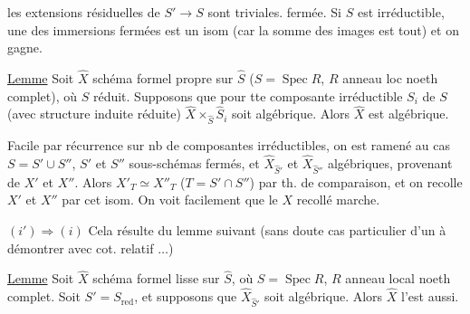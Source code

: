 les extensions résiduelles de $S'\longrightarrow S$ sont triviales.    fermée. Si $S$ est irréductible, une des immersions fermées  est un isom (car la somme des images est tout) et on gagne.  


\uline{Lemme} Soit $\widehat X$ schéma formel propre sur $\widehat S$ ($S=\operatorname{Spec}R$, $R$ anneau loc noeth complet), où $S$ réduit. Supposons que pour tte composante irréductible $S_i$ de $S$ (avec structure induite réduite) $\widehat X\times_{\widehat S}\widehat S_i$ soit algébrique. Alors $\widehat X$ est algébrique.

Facile par récurrence sur nb de composantes irréductibles, on est ramené au cas $S=S'\cup S''$, $S'$ et $S''$ sous-schémas fermés, et $\widehat X_{\widehat S'}$ et $\widehat X_{\widehat S''}$  algébriques, provenant de $X'$ et $X''$. Alors $X'_T\simeq X''_T$ ($T=S'\cap S''$) par th. de comparaison, et on recolle $X'$ et $X''$ par cet isom. On voit facilement que le $X$ recollé marche.

$(i')\Longrightarrow(i)$ Cela résulte du lemme suivant (sans doute cas particulier d'un   à démontrer avec  cot. relatif $\ldots$)

\uline{Lemme} Soit $\widehat X$ schéma formel  lisse sur $\widehat S$, où $S=\operatorname{Spec}R$, $R$ anneau local noeth complet. Soit $S'=S_{\mathrm{red}}$, et supposons que $\widehat X_{\widehat S'}$ soit algébrique. Alors $\widehat X$ l'est aussi.

